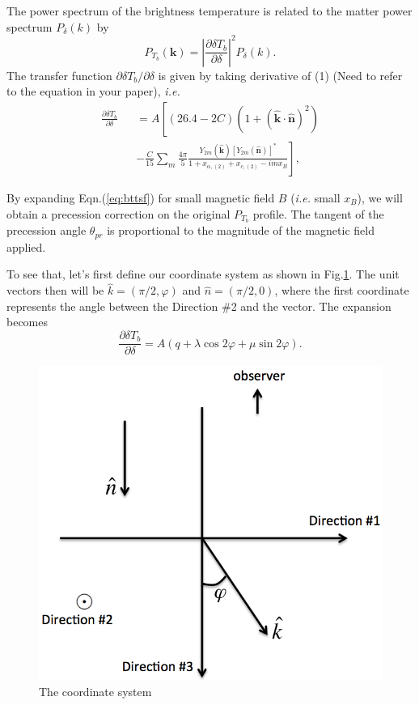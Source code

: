\documentclass[aps,prd,twocolumn,floatfix,showpacs,superscriptaddress,nofootinbib]{revtex4-1}
\newcommand{\ie}{{\it i.e. }}
\begin{document}
The power spectrum of the brightness temperature is related to the matter power spectrum $P_\delta(k)$ by
\begin{equation}
P_{T_b}(\bm k)=\left\vert\frac{\partial\delta T_b}{\partial\delta}\right\vert^2 P_\delta(k).
\end{equation}
The transfer function $\partial\delta T_b/\partial\delta$ is given by taking derivative of (1){\color{red} (Need to refer to the equation in your paper)}, \ie
\begin{eqnarray}
\frac{\partial\delta T_b}{\partial\delta}&&=A\left[(26.4-2C)\left(1 + (\hat{\bm k} \cdot \hat{\bm n})^2\right)\right. \nonumber\\
&&\left.-\frac{C}{15}\sum_m \frac{4\pi}{5}\frac{Y_{2m}(\hat{\bm k})[Y_{2m}(\hat{\bm n})]^*}{1+x_{\alpha,(2)}+x_{c,(2)}-imx_B}\right],
\label{eq:bttsf}
\end{eqnarray}

By expanding Eqn.(\ref{eq:bttsf}) for small magnetic field $B$ (\ie small $x_B$), we will obtain a precession correction on the original $P_{T_b}$ profile. The tangent of the precession angle $\theta_{pr}$ is proportional to the magnitude of the magnetic field applied.

To see that, let's first define our coordinate system as shown in Fig.\ref{fig:coordinate}. The unit vectors then will be $\hat{k}=(\pi/2,\varphi)$ and $\hat{n}=(\pi/2,0)$, where the first coordinate represents the angle between the Direction \#2 and the vector. The expansion becomes
\begin{equation}
\frac{\partial\delta T_b}{\partial\delta}=A(q+\lambda\cos 2\varphi+\mu\sin 2\varphi).
\label{eq:Tbtsf_simplified}
\end{equation}
\begin{figure}
\centering
\includegraphics[scale=0.3]{coordinate.png}
\caption{The coordinate system}
\label{fig:coordinate}
\end{figure}
\end{document}
